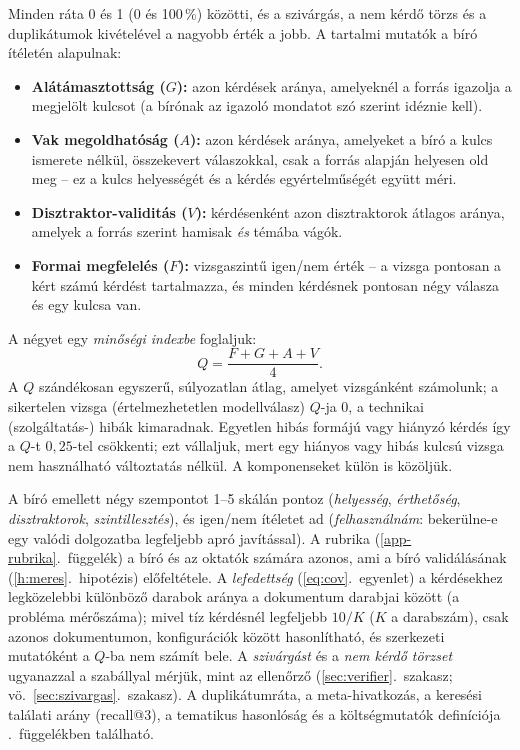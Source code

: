 Minden ráta 0 és 1 (0 és 100\,\%) közötti, és a szivárgás, a nem kérdő törzs és a duplikátumok
kivételével a nagyobb érték a jobb. A tartalmi mutatók a bíró ítéletén alapulnak:
\begin{itemize}[leftmargin=*,itemsep=1pt,topsep=2pt]
\item \textbf{Alátámasztottság ($G$):} azon kérdések aránya, amelyeknél a forrás igazolja a megjelölt kulcsot (a bírónak az igazoló mondatot szó szerint idéznie kell).
\item \textbf{Vak megoldhatóság ($A$):} azon kérdések aránya, amelyeket a bíró a kulcs ismerete nélkül, összekevert válaszokkal, csak a forrás alapján helyesen old meg -- ez a kulcs helyességét és a kérdés egyértelműségét együtt méri.
\item \textbf{Disztraktor-validitás ($V$):} kérdésenként azon disztraktorok átlagos aránya, amelyek a forrás szerint hamisak \emph{és} témába vágók.
\item \textbf{Formai megfelelés ($F$):} vizsgaszintű igen/nem érték -- a vizsga pontosan a kért számú kérdést tartalmazza, és minden kérdésnek pontosan négy válasza és egy kulcsa van.
\end{itemize}
A négyet egy \emph{minőségi indexbe} foglaljuk:
\begin{equation}
Q=\frac{F+G+A+V}{4}.
\label{eq:qindex}
\end{equation}
A $Q$ szándékosan egyszerű, súlyozatlan átlag, amelyet vizsgánként számolunk; a sikertelen vizsga
(értelmezhetetlen modellválasz) $Q$-ja 0, a technikai (szolgáltatás-) hibák kimaradnak. Egyetlen hibás
formájú vagy hiányzó kérdés így a $Q$-t $0{,}25$-tel csökkenti; ezt vállaljuk, mert egy hiányos vagy hibás
kulcsú vizsga nem használható változtatás nélkül. A komponenseket külön is közöljük.

A bíró emellett négy szempontot 1--5 skálán pontoz (\emph{helyesség}, \emph{érthetőség},
\emph{disztraktorok}, \emph{szintillesztés}), és igen/nem ítéletet ad (\emph{felhasználnám}: bekerülne-e
egy valódi dolgozatba legfeljebb apró javítással). A rubrika (\ref{app-rubrika}.~függelék) a bíró és az
oktatók számára azonos, ami a bíró validálásának (\ref{h:meres}.~hipotézis) előfeltétele. A
\emph{lefedettség} (\ref{eq:cov}.~egyenlet) a kérdésekhez legközelebbi különböző darabok aránya a
dokumentum darabjai között (a  probléma mérőszáma); mivel tíz kérdésnél legfeljebb $10/K$ ($K$ a
darabszám), csak azonos dokumentumon, konfigurációk között hasonlítható, és szerkezeti mutatóként a $Q$-ba
nem számít bele. A \emph{szivárgást} és a \emph{nem kérdő törzset} ugyanazzal a szabállyal mérjük, mint az
ellenőrző (\ref{sec:verifier}.~szakasz; vö.\ \ref{sec:szivargas}.~szakasz). A duplikátumráta, a
meta-hivatkozás, a keresési találati arány (recall@3), a tematikus hasonlóság és a költségmutatók
definíciója \az{\ref{app-mutatok}}.~függelékben található.

